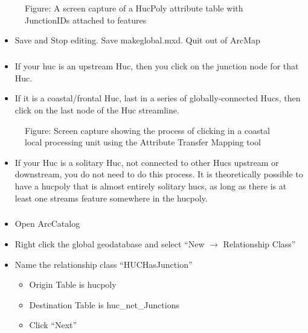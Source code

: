 \documentclass[letterpaper,10pt,english]{sphinxmanual}
\begin{document}
\begin{figure}[htbp]
\centering
\capstart

\noindent{}
\caption{Figure: A screen capture of a HucPoly attribute table with JunctionIDs attached to features}\label{\detokenize{ex_2:id38}}\end{figure}
\begin{itemize}
\item {} 
Save and Stop editing. Save makeglobal.mxd.  Quit out of ArcMap

\end{itemize}


\subparagraph{}
\label{\detokenize{ex_2:notes}}\begin{itemize}
\item {} 
If your huc is an upstream Huc, then you click on the junction node for that Huc.

\item {} 
If it is a coastal/frontal Huc, last in a series of globally-connected Hucs, then click on the last node of the Huc streamline.

\end{itemize}

\begin{figure}[htbp]
\centering
\capstart

\noindent{}
\caption{Figure: Screen capture showing the process of clicking in a coastal local processing unit using the Attribute Transfer Mapping tool}\label{\detokenize{ex_2:id39}}\end{figure}
\begin{itemize}
\item {} 
If your Huc is a solitary Huc, not connected to other Hucs upstream or downstream, you do not need to do this process. It is theoretically possible to have a hucpoly that is almost entirely solitary hucs, as long as there is at least one streams feature somewhere in the hucpoly.

\end{itemize}


\subparagraph{}
\label{\detokenize{ex_2:relationship-class}}\begin{itemize}
\item {} 
Open ArcCatalog

\item {} 
Right click the global geodatabase and select “New \(\rightarrow\) Relationship Class”

\item {} 
Name the relationship class “HUCHasJunction”
\begin{itemize}
\item {} 
Origin Table is hucpoly

\item {} 
Destination Table is huc\_net\_Junctions

\item {} 
Click “Next”

\end{itemize}

\end{itemize}
\end{document}
